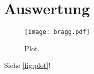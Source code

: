 \section{Auswertung}
\label{sec:Auswertung}

\begin{figure}
  \centering
  \texttt{[image: bragg.pdf]}
  \caption{Plot.}
  \label{fig:plot}
\end{figure}


Siehe \autoref{fig:plot}!
